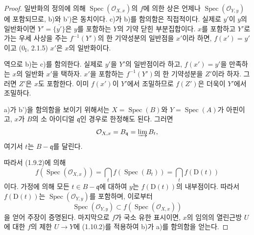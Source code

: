 \begin{proof}
일반화의 정의에 의해 $\operatorname{Spec}(\mathcal O_{X,x})$의
$f$에 의한 상은 언제나 $\operatorname{Spec}(\mathcal O_{Y,y})$에
포함되므로, b)와 b')은 동치이다. c)가 b)를 함의함은 직접적이다.
실제로 $y'$이 $y$의 일반화이면
$Y'=\overline{\{y'\}}$은 $y$를 포함하는 $Y$의 기약 닫힌 부분집합이다.
$x$를 포함하고 $Y'$로 가는 우세 사상을 주는 $f^{-1}(Y')$의 한
기약성분의 일반점을 $x'$이라 하면, $f(x')=y'$이고
($0_{\mathrm I}$, 2.1.5) $x'$은 $x$의 일반화이다.

역으로 b)는 c)를 함의한다. 실제로 $y'$을 $Y'$의 일반점이라 하고,
$f(x')=y'$을 만족하는 $x$의 일반화 $x'$을 택하자. $x'$을 포함하는
$f^{-1}(Y')$의 한 기약성분을 $Z'$이라 하자. 그러면 $Z'$은 $x$도
포함한다. 이미 $f(x')$이 $Y'$에서 조밀하므로 $f(Z')$은 더욱이
$Y'$에서 조밀하다.

a)가 b')을 함의함을 보이기 위해서는 $X=\operatorname{Spec}(B)$와
$Y=\operatorname{Spec}(A)$가 아핀이고, $x$가 $B$의 소 아이디얼
$\mathfrak q$인 경우로 한정해도 된다. 그러면
\[
  \mathcal O_{X,x}=B_{\mathfrak q}=\varinjlim B_t,
\]
여기서 $t$는 $B-\mathfrak q$를 달린다.


따라서 (1.9.2)에 의해
\[
  f(\operatorname{Spec}(\mathcal O_{X,x}))
  =\bigcap_t f(\operatorname{Spec}(B_t))=\bigcap_t f(\mathrm D(t))
\]
이다. 가정에 의해 모든 $t\in B-\mathfrak q$에 대하여 $y$는
$f(\mathrm D(t))$의 내부점이다. 따라서 $f(\mathrm D(t))$는
$\operatorname{Spec}(\mathcal O_{Y,y})$를 포함하며, 이로부터
\[
  \operatorname{Spec}(\mathcal O_{Y,y})
  \subset f(\operatorname{Spec}(\mathcal O_{X,x}))
\]
을 얻어 주장이 증명된다. 마지막으로 $f$가 국소 유한 표시이면,
$x$의 임의의 열린근방 $U$에 대한 $f$의 제한 $U\to Y$에 (1.10.2)를
적용하여 b)가 a)를 함의함을 얻는다.
\end{proof}

